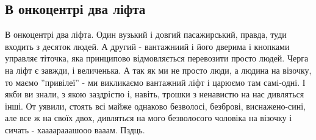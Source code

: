  
 
 
 
 
\subsection{В онкоцентрі два ліфта}

В онкоцентрі два ліфта. Один вузький і довгий пасажирський, правда, туди
входить з десяток людей. А другий - вантажниий і його дверима і кнопками
управляє тіточка, яка принципово відмовляється перевозити просто людей. Черга
на ліфт є завжди, і величенька. А так як ми не просто люди, а людина на
візочку, то маємо ''привілеї'' - ми викликаємо вантажний ліфт і царюємо там
самі-одні. І якби ви знали, з якою заздрістю і, навіть, трошки з ненавистю на
нас дивляться інші. От уявили, стоять всі майже однаково безволосі, безброві,
виснажено-сині, але все ж на своїх двох, дивляться на мого безволосого чоловіка
на візочку і сичать - хаааарааашооо вааам. Пздць.
